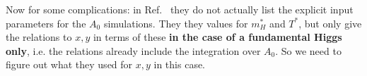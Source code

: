 \documentclass[11pt,a4paper]{article}
\begin{document}
Now for some complications: in Ref.~\cite{Kajantie:1995kf} they do not actually list the explicit input parameters for the $A_0$ simulations. They they values for $m^*_H$ and $T^*$, but only give the relations to $x,y$ in terms of these \textbf{in the case of a fundamental Higgs only}, i.e. the relations already include the integration over $A_0$. So we need to figure out what they used for $x,y$ in this case. 

\end{document}

